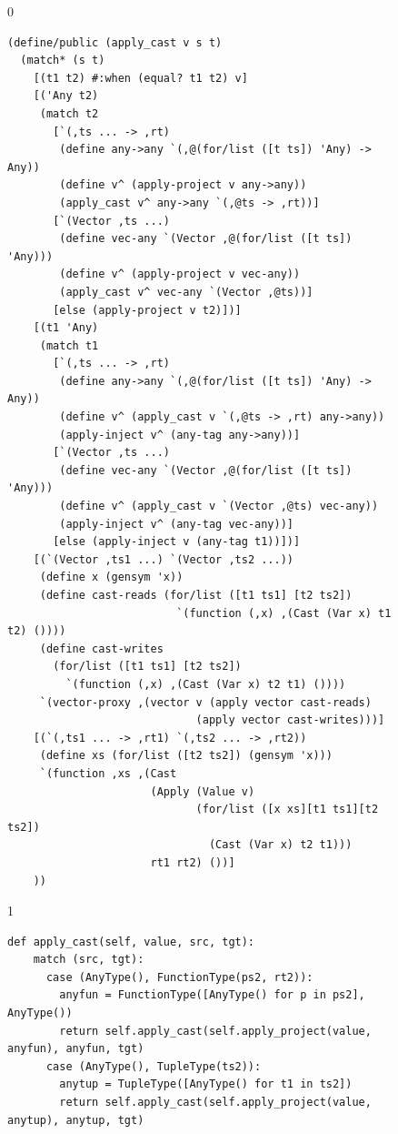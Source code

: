 \documentclass[7x10]{TimesAPriori_MIT}%
\def\racketEd{0}
\def\pythonEd{1}
\def\edition{1}
\newcommand{\pythonColor}[0]{}
\numberwithin{theorem}{chapter}
\numberwithin{definition}{chapter}
\numberwithin{equation}{chapter}
\begin{document}
\begin{figure}[tbp]
  \begin{tcolorbox}[colback=white]
{\if\edition\racketEd    
\begin{lstlisting}[basicstyle=\ttfamily\footnotesize]
(define/public (apply_cast v s t)
  (match* (s t)
    [(t1 t2) #:when (equal? t1 t2) v]
    [('Any t2) 
     (match t2
       [`(,ts ... -> ,rt)
        (define any->any `(,@(for/list ([t ts]) 'Any) -> Any))
        (define v^ (apply-project v any->any))
        (apply_cast v^ any->any `(,@ts -> ,rt))]
       [`(Vector ,ts ...)
        (define vec-any `(Vector ,@(for/list ([t ts]) 'Any)))
        (define v^ (apply-project v vec-any))
        (apply_cast v^ vec-any `(Vector ,@ts))]
       [else (apply-project v t2)])]
    [(t1 'Any) 
     (match t1
       [`(,ts ... -> ,rt)
        (define any->any `(,@(for/list ([t ts]) 'Any) -> Any))
        (define v^ (apply_cast v `(,@ts -> ,rt) any->any))
        (apply-inject v^ (any-tag any->any))]
       [`(Vector ,ts ...)
        (define vec-any `(Vector ,@(for/list ([t ts]) 'Any)))
        (define v^ (apply_cast v `(Vector ,@ts) vec-any))
        (apply-inject v^ (any-tag vec-any))]
       [else (apply-inject v (any-tag t1))])]
    [(`(Vector ,ts1 ...) `(Vector ,ts2 ...))
     (define x (gensym 'x))
     (define cast-reads (for/list ([t1 ts1] [t2 ts2])
                          `(function (,x) ,(Cast (Var x) t1 t2) ())))
     (define cast-writes
       (for/list ([t1 ts1] [t2 ts2])
         `(function (,x) ,(Cast (Var x) t2 t1) ())))
     `(vector-proxy ,(vector v (apply vector cast-reads)
                             (apply vector cast-writes)))]
    [(`(,ts1 ... -> ,rt1) `(,ts2 ... -> ,rt2))
     (define xs (for/list ([t2 ts2]) (gensym 'x)))
     `(function ,xs ,(Cast
                      (Apply (Value v)
                             (for/list ([x xs][t1 ts1][t2 ts2])
                               (Cast (Var x) t2 t1)))
                      rt1 rt2) ())]
    ))
\end{lstlisting}
\fi}
{\if\edition\pythonEd\pythonColor
\begin{lstlisting}[basicstyle=\ttfamily\footnotesize]
  def apply_cast(self, value, src, tgt):
    match (src, tgt):
      case (AnyType(), FunctionType(ps2, rt2)):
        anyfun = FunctionType([AnyType() for p in ps2], AnyType())
        return self.apply_cast(self.apply_project(value, anyfun), anyfun, tgt)
      case (AnyType(), TupleType(ts2)):
        anytup = TupleType([AnyType() for t1 in ts2])
        return self.apply_cast(self.apply_project(value, anytup), anytup, tgt)

\end{lstlisting}}
\end{tcolorbox}
\end{figure}
\end{document}
